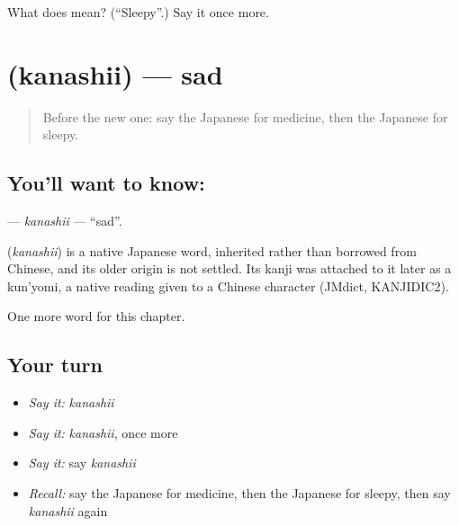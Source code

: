 \begin{tcolorbox}[breakable,colback=teal!4,colframe=teal!35!black,title={Before you move on}]
What does  mean? (\textquotedblleft{}Sleepy\textquotedblright{}.) Say it once more.
\end{tcolorbox}
\section[\texorpdfstring{\ja{かなしい} (kanashii)}{かなしい (kanashii)}]{ (kanashii) — sad}

\label{lesson:JA-C23-kanashii}



\begin{quote}
Before the new one: say the Japanese for medicine, then the Japanese for sleepy.
\end{quote}

\subsection*{You'll want to know: }
\textbf{} — \emph{kanashii} — \textquotedblleft{}sad\textquotedblright{}.

\begin{cousinweb}
\textbf{} (\emph{kanashii}) is a native Japanese word, inherited rather than borrowed from Chinese, and its older origin is not settled. Its kanji was attached to it later as a kun'yomi, a native reading given to a Chinese character (JMdict, KANJIDIC2).
\end{cousinweb}

\begin{grammarlens}[title={What you've built}]
One more word for this chapter.
\end{grammarlens}

\subsection*{Your turn}
\begin{itemize}
\raggedright
  \item \emph{Say it:} \emph{kanashii}
  \item \emph{Say it:} \emph{kanashii}, once more
  \item \emph{Say it:} say \emph{kanashii}
  \item \emph{Recall:} say the Japanese for medicine, then the Japanese for sleepy, then say \emph{kanashii} again
\end{itemize}

